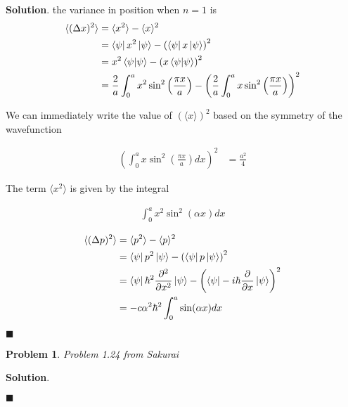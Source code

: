 \documentclass[12pt]{article}
\newtheorem{p}{Problem}
\theoremstyle{definition}
\newenvironment{s}{%
        \begin{trivlist} \item \textbf{Solution}. }{%
            \hspace*{\fill} $\blacksquare$\end{trivlist}}%
\begin{document}
{\begin{s}
the variance in position when $n=1$ is
\begin{align*}
\langle (\Delta x)^{2}\rangle &= \langle x^{2} \rangle - \langle x\rangle^{2}\\
&= \bra{\psi} x^{2} \ket{\psi} - \left(\bra{\psi} x \ket{\psi}\right)^{2}\\
&= x^{2}\bra{\psi}\ket{\psi} - \left(x\bra{\psi}\ket{\psi}\right)^{2}\\
&= \frac{2}{a}\int_{0}^{a} x^{2} \sin^{2}\left(\frac{\pi x}{a}\right) - \left(\frac{2}{a}\int_{0}^{a} x \sin^{2}\left(\frac{\pi x}{a}\right)\right)^{2}
\end{align*}

We can immediately write the value of $\left(\langle x \rangle\right)^{2}$ based on the symmetry of the wavefunction

\begin{align*}
\left(\int_{0}^{a} x \sin^{2}\left(\frac{\pi x}{a}\right)dx\right)^{2} &= \frac{a^{2}}{4}
\end{align*}

The term $\langle x^{2} \rangle$ is given by the integral

\begin{align*}
\int_{0}^{a} x^{2} \sin^{2}\left(\alpha x\right)dx 
\end{align*}

\begin{align*}
\langle (\Delta p)^{2}\rangle &= \langle p^{2} \rangle - \langle p\rangle^{2}\\
&= \bra{\psi} p^{2} \ket{\psi} - \left(\bra{\psi} p \ket{\psi}\right)^{2}\\
&= \bra{\psi} \hbar^{2}\frac{\partial^{2}}{\partial x^{2}} \ket{\psi} - \left(\bra{\psi} -i\hbar\frac{\partial}{\partial x} \ket{\psi}\right)^{2}\\
&= -c\alpha^{2}\hbar^{2}\int_{0}^{a} \sin(\alpha x)dx
\end{align*}

\end{s}

\begin{p}
Problem 1.24 from Sakurai
\end{p}

\begin{s} 

\end{s}
\end{document}
